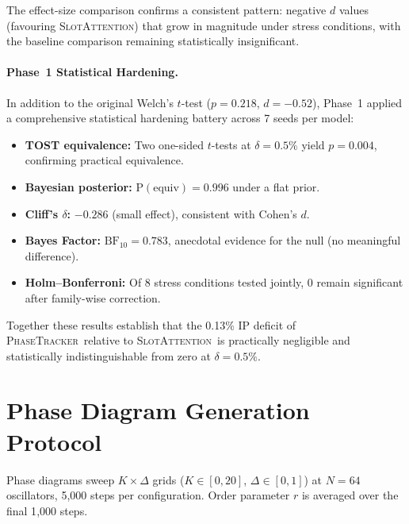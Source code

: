 \documentclass[11pt]{article}
\providecommand{\pt}{\textnormal{\textsc{PhaseTracker}}\xspace}
\providecommand{\sa}{\textnormal{\textsc{SlotAttention}}\xspace}
\begin{document}
The effect-size comparison confirms a consistent pattern: negative $d$ values
(favouring \sa) that grow in magnitude under stress conditions,
with the baseline comparison remaining statistically insignificant.

\paragraph{Phase~1 Statistical Hardening.}
In addition to the original Welch's $t$-test ($p = 0.218$, $d = -0.52$),
Phase~1 applied a comprehensive statistical hardening battery across
7 seeds per model:

\begin{itemize}
  \item \textbf{TOST equivalence:} Two one-sided $t$-tests at
        $\delta = 0.5\%$ yield $p = 0.004$, confirming practical
        equivalence.
  \item \textbf{Bayesian posterior:} $\mathrm{P(equiv)} = 0.996$
        under a flat prior.
  \item \textbf{Cliff's $\delta$:} $-0.286$ (small effect),
        consistent with Cohen's $d$.
  \item \textbf{Bayes Factor:} $\mathrm{BF}_{10} = 0.783$,
        anecdotal evidence for the null (no meaningful difference).
  \item \textbf{Holm--Bonferroni:} Of 8 stress conditions tested
        jointly, 0 remain significant after family-wise correction.
\end{itemize}

Together these results establish that the 0.13\% IP deficit of \pt\
relative to \sa\ is practically negligible and statistically
indistinguishable from zero at $\delta = 0.5\%$.

\section{Phase Diagram Generation Protocol}
\label{app:phase_diagram}

Phase diagrams sweep $K \times \Delta$ grids ($K \in [0, 20]$,
$\Delta \in [0, 1]$) at $N = 64$ oscillators, 5{,}000 steps per
configuration.  Order parameter $r$ is averaged over the final
1{,}000 steps.

\end{document}
